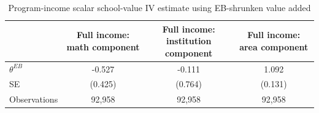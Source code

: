 \begin{table}[!htbp]
\centering
\caption{Program-income scalar school-value IV estimate using EB-shrunken value added}
\label{tab:scalar_school_value_iv_program_income_expected_va_eb}
\begin{tabular}{lccc}
\toprule
 & Full income: math component & Full income: institution component & Full income: area component \\
\midrule
$\theta^{EB}$ & -0.527 & -0.111 & 1.092 \\
SE & (0.425) & (0.764) & (0.131) \\
Observations & 92,958 & 92,958 & 92,958 \\
\bottomrule
\end{tabular}
\end{table}
